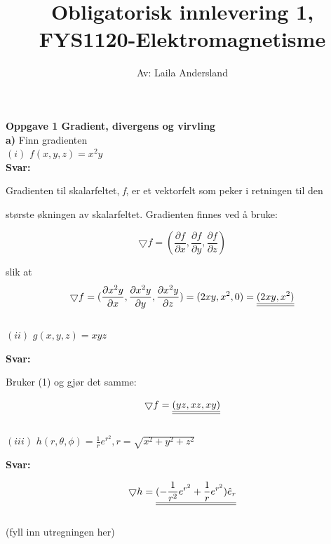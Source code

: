 \documentclass[a4paper,norsk,12pt]{article}
\title{\vspace{-4.0cm} \textbf{Obligatorisk innlevering 1, FYS1120-Elektromagnetisme}}
\author{Av: Laila Andersland}
\begin{document}
\maketitle

\textbf{Oppgave 1 \hspace{3mm}  Gradient, divergens og virvling} \\

\textbf{a)} \hspace{3mm}  { Finn gradienten} \\

$(i)$ \hspace{3mm} $f(x,y,z) = x^{2} y$ \\

\textbf{Svar:}

{Gradienten til skalarfeltet, \textit{f}, er et vektorfelt som peker i retningen til den} 

{største økningen av skalarfeltet. Gradienten finnes ved å bruke:}

\begin{equation}
\bigtriangledown f = ( \frac{\partial f}{\partial x} , \frac{\partial f}{\partial y} , \frac{\partial f}{\partial z} )
\end{equation}

slik at
$$
\bigtriangledown f = ( \frac{\partial x^{2}y}{\partial x} , \frac{\partial x^2 y}{\partial y} , \frac{\partial x^2 y}{\partial z} ) 
=
\def\doubleunderline#1{\underline{\underline{#1}}}
 (2xy , x^2 , 0) = \doubleunderline{(2xy,x^2)}
$$\\

$(ii)$ \hspace{3mm} $g(x,y,z) = x y z $ \

\textbf{Svar:}

Bruker (1) og gjør det samme:

$$
\def\doubleunderline#1{\underline{\underline{#1}}}
\bigtriangledown f  = \doubleunderline{(yz, xz, xy)}
$$ \\


$(iii)$ \hspace{3mm} $h(r,\theta ,\phi) = \frac{1}{r} e^{r^2} , r = \sqrt{x^2 + y^2 + z^2} $ \

\textbf{Svar:}

$$
\def\doubleunderline#1{\underline{\underline{#1}}}
\bigtriangledown h  = \doubleunderline{(- \frac{1}{r^2} e^{r^2} + \frac{1}{r} e^{r^2} ) \hat{e}_r}
$$ \\



(fyll inn utregningen her)\\
\end{document}
